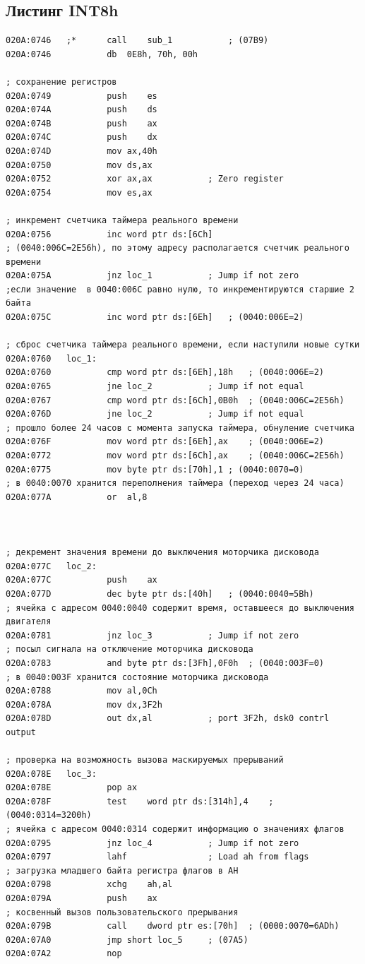 \documentclass[a4paper,12pt]{article}
\begin{document}
\subsection{Листинг INT8h} 
\begin{lstlisting}[style={asm}]
	020A:0746	;*		call	sub_1			; (07B9)
020A:0746			db	0E8h, 70h, 00h

; сохранение регистров
020A:0749			push	es
020A:074A			push	ds
020A:074B			push	ax
020A:074C			push	dx
020A:074D			mov	ax,40h
020A:0750			mov	ds,ax
020A:0752			xor	ax,ax			; Zero register
020A:0754			mov	es,ax

; инкремент счетчика таймера реального времени
020A:0756			inc	word ptr ds:[6Ch]	
; (0040:006C=2E56h), по этому адресу располагается счетчик реального времени
020A:075A			jnz	loc_1			; Jump if not zero
;если значение  в 0040:006C равно нулю, то инкрементируются старшие 2 байта
020A:075C			inc	word ptr ds:[6Eh]	; (0040:006E=2)

; сброс счетчика таймера реального времени, если наступили новые сутки
020A:0760	loc_1:
020A:0760			cmp	word ptr ds:[6Eh],18h	; (0040:006E=2)
020A:0765			jne	loc_2			; Jump if not equal
020A:0767			cmp	word ptr ds:[6Ch],0B0h	; (0040:006C=2E56h)
020A:076D			jne	loc_2			; Jump if not equal
; прошло более 24 часов с момента запуска таймера, обнуление счетчика
020A:076F			mov	word ptr ds:[6Eh],ax	; (0040:006E=2)
020A:0772			mov	word ptr ds:[6Ch],ax	; (0040:006C=2E56h)
020A:0775			mov	byte ptr ds:[70h],1	; (0040:0070=0)
; в 0040:0070 хранится переполнения таймера (переход через 24 часа)
020A:077A			or	al,8



; декремент значения времени до выключения моторчика дисковода
020A:077C	loc_2:
020A:077C			push	ax
020A:077D			dec	byte ptr ds:[40h]	; (0040:0040=5Bh)
; ячейка с адресом 0040:0040 содержит время, оставшееся до выключения двигателя
020A:0781			jnz	loc_3			; Jump if not zero
; посыл сигнала на отключение моторчика дисковода
020A:0783			and	byte ptr ds:[3Fh],0F0h	; (0040:003F=0)
; в 0040:003F хранится состояние моторчика дисковода
020A:0788			mov	al,0Ch
020A:078A			mov	dx,3F2h
020A:078D			out	dx,al			; port 3F2h, dsk0 contrl output

; проверка на возможность вызова маскируемых прерываний
020A:078E	loc_3:
020A:078E			pop	ax
020A:078F			test	word ptr ds:[314h],4	; (0040:0314=3200h)
; ячейка с адресом 0040:0314 содержит информацию о значениях флагов
020A:0795			jnz	loc_4			; Jump if not zero
020A:0797			lahf				; Load ah from flags
; загрузка младшего байта регистра флагов в AH
020A:0798			xchg	ah,al
020A:079A			push	ax
; косвенный вызов пользовательского прерывания
020A:079B			call	dword ptr es:[70h]	; (0000:0070=6ADh)
020A:07A0			jmp	short loc_5		; (07A5)
020A:07A2			nop


\end{lstlisting}
\end{document}
